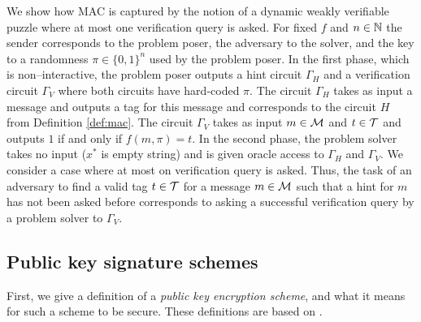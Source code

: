 We show how MAC is captured by the notion of a dynamic weakly verifiable puzzle where at most one verification query is asked.
For fixed $f$ and $n \in \mathbb{N}$ the sender corresponds to the problem poser, the adversary to the solver,
and the key to a randomness $\pi \in \{0,1\}^{n}$ used by the problem poser.
In the first phase, which is non--interactive, the problem poser outputs a hint circuit
$\Gamma_H$ and a verification circuit $\Gamma_V$ where both circuits have hard-coded $\pi$.
The circuit $\Gamma_H$ takes as input a message and outputs a tag for this message and corresponds to the circuit $H$ from Definition \ref{def:mac}.
The circuit $\Gamma_V$ takes as input $m \in \mathcal{M}$ and $t \in \mathcal{T}$ and outputs $1$ if and only if $f(m, \pi) = t$.
In the second phase, the problem solver takes no input ($x^*$ is empty string) and is given oracle access to $\Gamma_H$ and $\Gamma_V$.
We consider a case where at most on verification query is asked.
Thus, the task of an adversary to find a valid tag $t \in \mathcal{T}$ for a message $m \in \mathcal{M}$ such that a hint for $m$ has not been asked before
corresponds to asking a successful verification query by a problem solver to $\Gamma_V$.
%
\subsection{Public key signature schemes}
First, we give a definition of a \textit{public key encryption scheme}, and what it means for such a scheme to be secure.
These definitions are based on \cite{Goldreich:2004:FCV:975541}.

